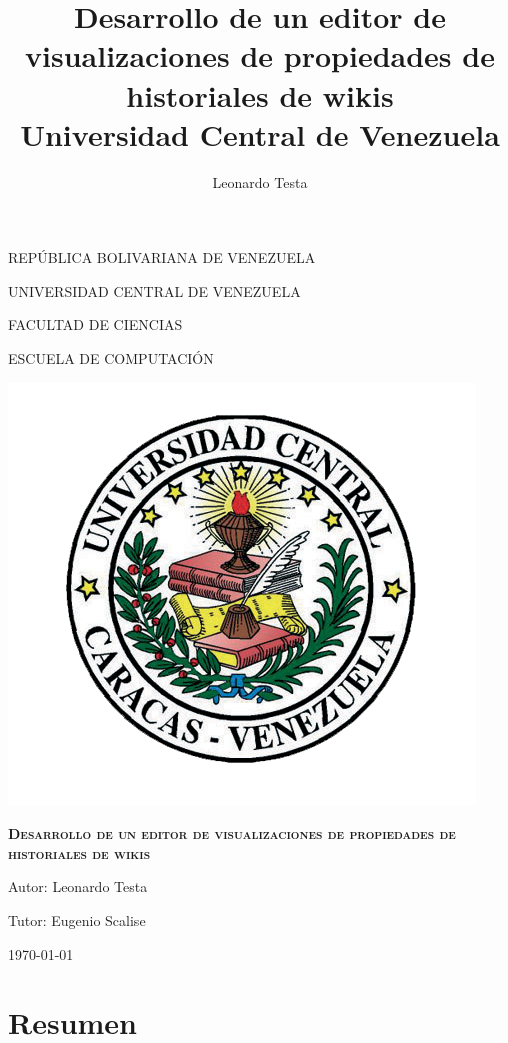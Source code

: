 \documentclass[12pt]{report}
\title{
	{Desarrollo de un editor de visualizaciones de propiedades de historiales de wikis}\\
	{\large Universidad Central de Venezuela}\\
}
\author{Leonardo Testa}
\begin{document}
\begin{titlepage}
	\centering
  REPÚBLICA BOLIVARIANA DE VENEZUELA\par
  UNIVERSIDAD CENTRAL DE VENEZUELA\par
  FACULTAD DE CIENCIAS\par
  ESCUELA DE COMPUTACIÓN\par\vspace{3cm}

	\includegraphics[scale=0.60]{ucv_logo.png}\par\vspace{1cm}
	{\scshape\Large\textbf{Desarrollo de un editor de visualizaciones de propiedades de historiales de wikis}\par}
	\vspace{1cm}
	{\Large Autor: Leonardo Testa\par}
	\vfill

  {\large Tutor: Eugenio Scalise\par}
	{\large \mydate\today \par}
\end{titlepage}

\chapter*{Resumen}


\tableofcontents

\listoffigures
\end{document}
